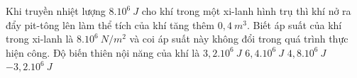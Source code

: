 \begin{ex} 
Khi truyền nhiệt lượng $8.10^{6} \ J$ cho khí trong một xi-lanh hình trụ thì khí nở ra đẩy pit-tông lên làm thể tích của khí tăng thêm $0,4 \ m^3$. Biết áp suất của khí trong xi-lanh là $8.10^{6} \ N/m^2$ và coi áp suất này không đổi trong quá trình thực hiện công. Độ biến thiên nội năng của khí là
\choice
{$3,2 . 10^{6} \ J$}
{$6,4 . 10^{6} \ J$}
{\True $4,8 . 10^{6} \ J$}
{$-3,2 . 10^{6} \ J$}
\end{ex}



